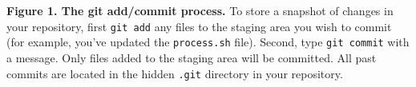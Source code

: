 \textbf{Figure 1. The git add/commit process.} To store a snapshot of changes in your repository, first \verb|git add| any files to the staging area you wish to commit (for example, you've updated the \verb|process.sh| file). Second, type \verb|git commit| with a message. Only files added to the staging area will be committed. All past commits are located in the hidden \verb|.git| directory in your repository. 